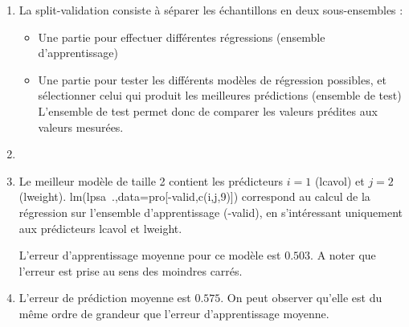 \documentclass[a4paper, 12pt]{article}
\begin{document}
\begin{enumerate}

\item La split-validation consiste à séparer les échantillons en deux sous-ensembles :

\begin{itemize}
\item Une partie pour effectuer différentes régressions (ensemble d'apprentissage)
\item Une partie pour tester les différents modèles de régression possibles, et sélectionner celui qui produit les meilleures prédictions (ensemble de test)
L'ensemble de test permet donc de comparer les valeurs prédites aux valeurs mesurées.
\end{itemize}

\item 

\item Le meilleur modèle de taille 2 contient les prédicteurs $i = 1$ (lcavol) et $j = 2$ (lweight). lm(lpsa~.,data=pro[-valid,c(i,j,9)]) correspond au calcul de la régression sur l'ensemble d'apprentissage (-valid), en s'intéressant uniquement aux prédicteurs lcavol et lweight.

L'erreur d'apprentissage moyenne pour ce modèle est $0.503$. A noter que l'erreur est prise au sens des moindres carrés.

\item L'erreur de prédiction moyenne est $0.575$. On peut observer qu'elle est du même ordre de grandeur que l'erreur d'apprentissage moyenne.

\end{enumerate}
\end{document}
